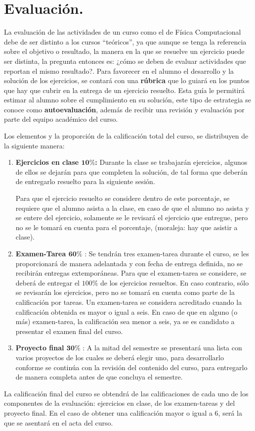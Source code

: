\section{Evaluación.}

La evaluación de las actividades de un curso como el de Física Computacional debe de ser distinto a los cursos \enquote{teóricos}, ya que aunque se tenga la referencia sobre el objetivo o resultado, la manera en la que se resuelve un ejercicio puede ser distinta, la pregunta entonces es: ¿cómo se deben de evaluar actividades que reportan el mismo resultado?. Para favorecer en el alumno el desarrollo y la solución de los ejercicios, se contará con una \textbf{rúbrica} que lo guiará en los puntos que hay que cubrir en la entrega de un ejercicio resuelto. Esta guía le permitirá estimar al alumno sobre el cumplimiento en su solución, este tipo de estrategia se conoce como \textbf{autoevaluación}, además de recibir una revisión y evaluación por parte del equipo académico del curso.
\par
Los elementos y la proporción de la calificación total del curso, se distribuyen de la siguiente manera:
\begin{enumerate}[label=\alph*)]
\item \textbf{Ejercicios en clase $\mathbf{10\%}$:} Durante la clase se trabajarán ejercicios, algunos de ellos se dejarán para que completen la solución, de tal forma que deberán de entregarlo resuelto para la siguiente sesión.
\par
Para que el ejercicio resuelto se considere dentro de este porcentaje, se requiere que el alumno asista a la clase, en caso de que el alumno no asista y se entere del ejercicio, solamente se le revisará el ejercicio que entregue, pero no se le tomará en cuenta para el porcentaje, (moraleja: hay que asistir a clase).
\item \textbf{Examen-Tarea $\mathbf{60\%}$} : Se tendrán tres examen-tarea durante el curso, se les proporcionará de manera adelantada y con fecha de entrega definida, no se recibirán entregas extemporáneas. Para que el examen-tarea se considere, se deberá de entregar el $100\%$ de los ejercicios resueltos. En caso contrario, sólo se revisarán los ejercicios, pero no se tomará en cuenta como parte de la calificación por tareas. Un examen-tarea se considera acreditado cuando la calificación obtenida es mayor o igual a seis. En caso de que en alguno (o más) examen-tarea, la calificación sea menor a seis, ya se es candidato a presentar el examen final del curso.
\item \textbf{Proyecto final $\mathbf{30\%}$} : A la mitad del semestre se presentará una lista con varios proyectos de los cuales se deberá elegir uno, para desarrollarlo conforme se continúa con la revisión del contenido del curso, para entregarlo de manera completa antes de que concluya el semestre.
\end{enumerate}
La calificación final del curso se obtendrá de las calificaciones de cada uno de los componentes de la evaluación: ejercicios en clase, de los examen-tareas y del proyecto final. En el caso de obtener una calificación mayor o igual a $6$, será la que se asentará en el acta del curso.


